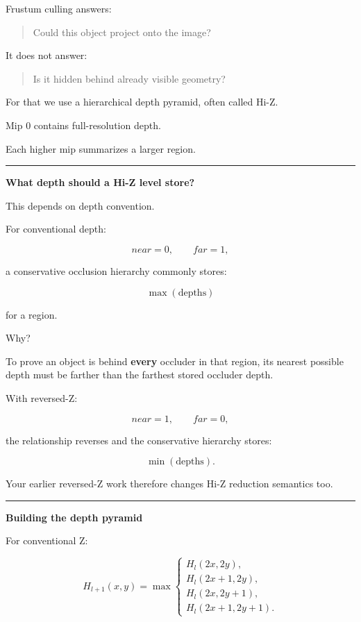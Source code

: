 Frustum culling answers:

\begin{quote}
Could this object project onto the image?
\end{quote}

It does not answer:

\begin{quote}
Is it hidden behind already visible geometry?
\end{quote}

For that we use a hierarchical depth pyramid, often called Hi-Z.

Mip 0 contains full-resolution depth.

Each higher mip summarizes a larger region.

\begin{center}\rule{0.5\linewidth}{0.5pt}\end{center}

\textbf{What depth should a Hi-Z level store?}

This depends on depth convention.

For conventional depth:

\[
near=0,
\qquad
far=1,
\]

a conservative occlusion hierarchy commonly stores:

\[
\boxed{
\max(\text{depths})
}
\]

for a region.

Why?

To prove an object is behind \textbf{every} occluder in that region, its nearest possible depth must be farther than the farthest stored occluder depth.

With reversed-Z:

\[
near=1,
\qquad
far=0,
\]

the relationship reverses and the conservative hierarchy stores:

\[
\boxed{
\min(\text{depths})
}.
\]

Your earlier reversed-Z work therefore changes Hi-Z reduction semantics too.

\begin{center}\rule{0.5\linewidth}{0.5pt}\end{center}

\textbf{Building the depth pyramid}

For conventional Z:

\[
H_{l+1}(x,y)
=
\max
\begin{cases}
H_l(2x,2y),\\
H_l(2x+1,2y),\\
H_l(2x,2y+1),\\
H_l(2x+1,2y+1).
\end{cases}
\]

